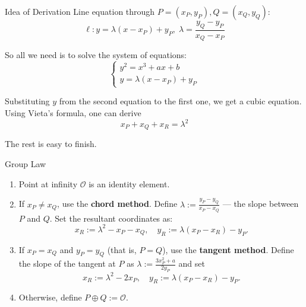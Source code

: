 \documentclass{zkdl-presentation-template}
\begin{document}
    \begin{frame}{Idea of Derivation}
        Line equation through $P=(x_P,y_P),Q=(x_Q,y_Q)$:
        \begin{equation*}
            \ell: y = \lambda (x-x_P) + y_P, \; \lambda = \frac{y_Q-y_P}{x_Q-x_P}
        \end{equation*}

        So all we need is to solve the system of equations:
        \begin{equation*}
            \begin{cases}
                y^2 = x^3+ax+b\\
                y = \lambda (x-x_P) + y_P
            \end{cases}
        \end{equation*}

        Substituting $y$ from the second equation to the first one, we get a cubic equation. Using Vieta's formula, one can derive
        \begin{equation*}
            x_P + x_Q + x_R = \lambda^2
        \end{equation*}

        The rest is easy to finish.
    \end{frame}

    \begin{frame}{Group Law}
        \begin{definition}
            \begin{enumerate}
                \item Point at infinity $\mathcal{O}$ is an identity element. 
                \item If $x_P\neq x_Q$, use the \textbf{chord method}. Define $\lambda := \frac{y_P-y_Q}{x_P-x_Q}$ --- the slope between $P$ and $Q$. Set the resultant coordinates as:
                \begin{equation*}
                    x_R := \lambda^2 - x_P - x_Q, \quad y_R := \lambda(x_P-x_R)-y_P.
                \end{equation*}
                \item If $x_P=x_Q$ and $y_P=y_Q$ (that is, $P=Q$), use the \textbf{tangent method}. Define the slope of the tangent at $P$ as $\lambda := \frac{3x_P^2+a}{2y_P}$ and set
                \begin{equation*}
                    x_R := \lambda^2 - 2x_P, \quad y_R := \lambda(x_P-x_R)-y_P.
                \end{equation*}
                \item Otherwise, define $P \oplus Q := \mathcal{O}$.
            \end{enumerate}
        \end{definition}
    \end{frame}
\end{document}
